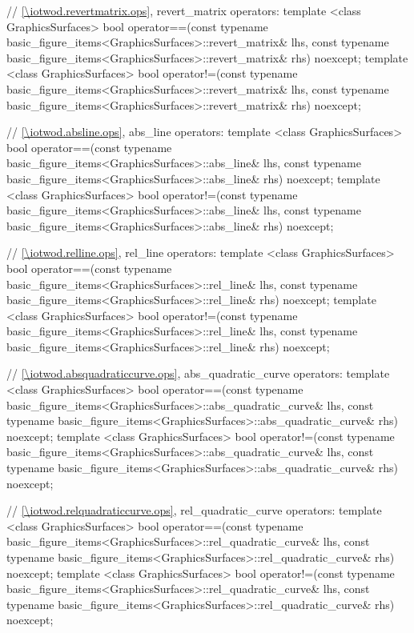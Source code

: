 \begin{codeblock}
{  // \ref{\iotwod.revertmatrix.ops}, revert_matrix operators:
  template <class GraphicsSurfaces>
  bool operator==(const typename basic_figure_items<GraphicsSurfaces>::revert_matrix& lhs,
    const typename basic_figure_items<GraphicsSurfaces>::revert_matrix& rhs) noexcept;
  template <class GraphicsSurfaces>
  bool operator!=(const typename basic_figure_items<GraphicsSurfaces>::revert_matrix& lhs,
    const typename basic_figure_items<GraphicsSurfaces>::revert_matrix& rhs) noexcept;

  // \ref{\iotwod.absline.ops}, abs_line operators:
  template <class GraphicsSurfaces>
  bool operator==(const typename basic_figure_items<GraphicsSurfaces>::abs_line& lhs,
    const typename basic_figure_items<GraphicsSurfaces>::abs_line& rhs) noexcept;
  template <class GraphicsSurfaces>
  bool operator!=(const typename basic_figure_items<GraphicsSurfaces>::abs_line& lhs,
    const typename basic_figure_items<GraphicsSurfaces>::abs_line& rhs) noexcept;

  // \ref{\iotwod.relline.ops}, rel_line operators:
  template <class GraphicsSurfaces>
  bool operator==(const typename basic_figure_items<GraphicsSurfaces>::rel_line& lhs,
    const typename basic_figure_items<GraphicsSurfaces>::rel_line& rhs) noexcept;
  template <class GraphicsSurfaces>
  bool operator!=(const typename basic_figure_items<GraphicsSurfaces>::rel_line& lhs,
    const typename basic_figure_items<GraphicsSurfaces>::rel_line& rhs) noexcept;

  // \ref{\iotwod.absquadraticcurve.ops}, abs_quadratic_curve operators:
  template <class GraphicsSurfaces>
  bool operator==(const typename basic_figure_items<GraphicsSurfaces>::abs_quadratic_curve& lhs,
    const typename basic_figure_items<GraphicsSurfaces>::abs_quadratic_curve& rhs) noexcept;
  template <class GraphicsSurfaces>
  bool operator!=(const typename basic_figure_items<GraphicsSurfaces>::abs_quadratic_curve& lhs,
    const typename basic_figure_items<GraphicsSurfaces>::abs_quadratic_curve& rhs) noexcept;

  // \ref{\iotwod.relquadraticcurve.ops}, rel_quadratic_curve operators:
  template <class GraphicsSurfaces>
  bool operator==(const typename basic_figure_items<GraphicsSurfaces>::rel_quadratic_curve& lhs,
    const typename basic_figure_items<GraphicsSurfaces>::rel_quadratic_curve& rhs) noexcept;
  template <class GraphicsSurfaces>
  bool operator!=(const typename basic_figure_items<GraphicsSurfaces>::rel_quadratic_curve& lhs,
    const typename basic_figure_items<GraphicsSurfaces>::rel_quadratic_curve& rhs) noexcept;

}
\end{codeblock}
